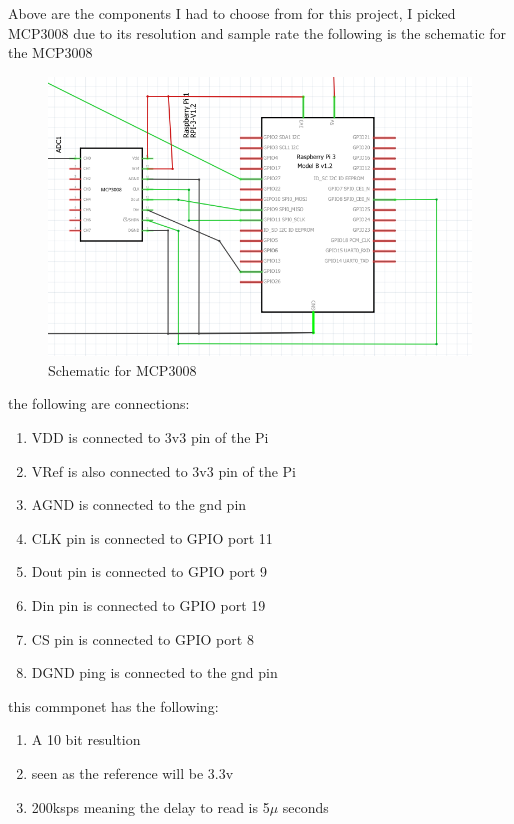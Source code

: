 Above are the components I had to choose from 
for this project, I picked  MCP3008 due to its  resolution and  sample rate
the following is the   schematic for the  MCP3008\cite{ada}
\begin{figure}[h!]
	\centering
	\includegraphics[width=0.6\linewidth]{Images/SchematicforMCP300.png}
	\caption{Schematic for  MCP3008}
	\label{Schematic for  MCP3008}
\end{figure}
the following are connections:
\begin{enumerate}
	\item VDD is connected to 3v3 pin of the  Pi
	\item VRef is  also connected to  3v3 pin of the  Pi
	\item AGND is connected to the gnd pin 
	\item CLK pin is connected to GPIO port 11
	\item Dout pin is connected to GPIO port 9
	\item Din pin is connected to GPIO port 19
	\item CS pin  is connected  to GPIO port 8
	\item DGND ping is connected to the gnd pin
\end{enumerate}
this  commponet has the following:
\begin{enumerate}
	\item A 10 bit resultion
	\item seen as  the  reference  will  be 3.3v  
	\item 200ksps meaning the delay to read is 5$\mu$ seconds
\end{enumerate}
